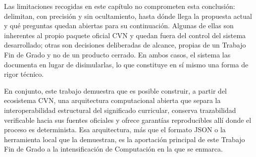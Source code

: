 Las limitaciones recogidas en este capítulo no comprometen esta conclusión:
delimitan, con precisión y sin ocultamiento, hasta dónde llega la propuesta
actual y qué preguntas quedan abiertas para su continuación. Algunas de
ellas son inherentes al propio paquete oficial CVN y quedan fuera del
control del sistema desarrollado; otras son decisiones deliberadas de
alcance, propias de un Trabajo Fin de Grado y no de un producto cerrado. En
ambos casos, el sistema las documenta en lugar de disimularlas, lo que
constituye en sí mismo una forma de rigor técnico.

En conjunto, este trabajo demuestra que es posible construir, a partir del
ecosistema CVN, una arquitectura computacional abierta que separa la
interoperabilidad estructural del significado curricular, conserva
trazabilidad verificable hacia sus fuentes oficiales y ofrece garantías
reproducibles allí donde el proceso es determinista. Esa arquitectura, más
que el formato JSON o la herramienta local que la demuestran, es la
aportación principal de este Trabajo Fin de Grado a la intensificación de
Computación en la que se enmarca.
